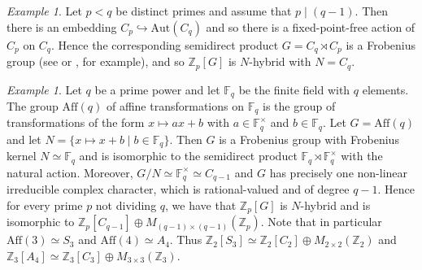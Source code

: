 \documentclass[12pt]{amsart}
\theoremstyle{plain}
\theoremstyle{remark}
\newtheorem{example}[theorem]{Example}
\theoremstyle{definition}
\numberwithin{equation}{section}
\begin{document}
\begin{example}\label{ex:metacyclic}
Let $p<q$ be distinct primes and assume that $p \mid (q-1)$.
Then there is an embedding $C_{p} \hookrightarrow {\mathrm{Aut}}(C_{q})$ and so there is
a fixed-point-free action of $C_{p}$ on $C_{q}$.
Hence the corresponding semidirect product $G = C_{q} \rtimes C_{p}$ is a Frobenius group
(see \cite[Theorem 2.12]{hybrid-ETNC} or \cite[\S 4.6]{MR2599132}, for example), and so ${\mathbb{Z}}_{p}[G]$ is $N$-hybrid with $N = C_{q}$.
\end{example}

\begin{example}\label{ex:affine}
Let $q$ be a prime power and let ${\mathbb{F}}_{q}$ be the finite field with $q$ elements.
The group ${\mathrm{Aff}}(q)$ of affine transformations on ${\mathbb{F}}_{q}$ is the group of transformations
of the form $x \mapsto ax +b$ with $a \in {\mathbb{F}}_{q}^{\times}$ and $b \in {\mathbb{F}}_{q}$.
Let $G={\mathrm{Aff}}(q)$ and let $N=\{ x \mapsto x+b \mid b \in {\mathbb{F}}_{q} \}$.
Then $G$ is a Frobenius group with Frobenius kernel $N \simeq {\mathbb{F}}_{q}$ and is isomorphic to
the semidirect product ${\mathbb{F}}_{q} \rtimes {\mathbb{F}}_{q}^{\times}$ with the natural action.
Moreover, $G/N \simeq {\mathbb{F}}_{q}^{\times} \simeq C_{q-1}$ and $G$ has precisely one
non-linear irreducible complex character, which is rational-valued and of degree $q-1$.
Hence for every prime $p$ not dividing $q$, we have that ${\mathbb{Z}}_{p}[G]$ is $N$-hybrid
and is isomorphic to ${\mathbb{Z}}_{p}[C_{q-1}] \oplus M_{(q-1) \times (q-1)}({\mathbb{Z}}_{p})$.
Note that in particular ${\mathrm{Aff}}(3) \simeq S_{3}$ and ${\mathrm{Aff}}(4) \simeq A_{4}$.
Thus ${\mathbb{Z}}_{2}[S_{3}] \simeq {\mathbb{Z}}_{2}[C_{2}] \oplus M_{2 \times 2}({\mathbb{Z}}_{2})$
and ${\mathbb{Z}}_{3}[A_{4}] \simeq {\mathbb{Z}}_{3}[C_{3}] \oplus M_{3 \times 3}({\mathbb{Z}}_{3})$.
\end{example}
\end{document}

